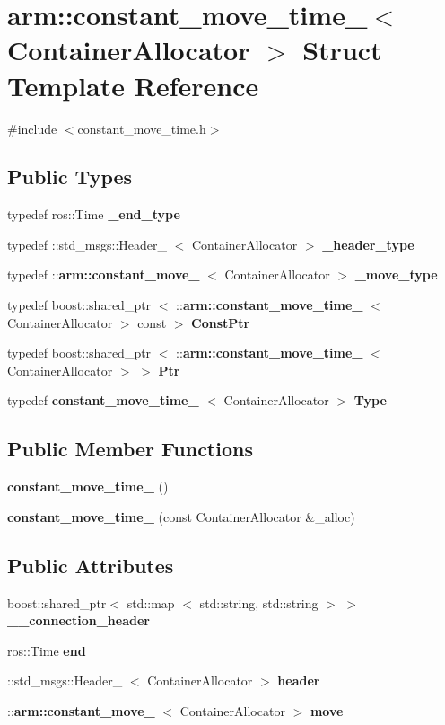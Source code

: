 \section{arm\-:\-:constant\-\_\-move\-\_\-time\-\_\-$<$ \-Container\-Allocator $>$ \-Struct \-Template \-Reference}
\label{structarm_1_1constant__move__time__}


{\ttfamily \#include $<$constant\-\_\-move\-\_\-time.\-h$>$}

\subsection*{\-Public \-Types}
\begin{DoxyCompactItemize}
\item 
typedef ros\-::\-Time {\bf \-\_\-end\-\_\-type}
\item 
typedef \-::std\-\_\-msgs\-::\-Header\-\_\-\*
$<$ \-Container\-Allocator $>$ {\bf \-\_\-header\-\_\-type}
\item 
typedef \-::{\bf arm\-::constant\-\_\-move\-\_\-}\*
$<$ \-Container\-Allocator $>$ {\bf \-\_\-move\-\_\-type}
\item 
typedef boost\-::shared\-\_\-ptr\*
$<$ \-::{\bf arm\-::constant\-\_\-move\-\_\-time\-\_\-}\*
$<$ \-Container\-Allocator $>$ const  $>$ {\bf \-Const\-Ptr}
\item 
typedef boost\-::shared\-\_\-ptr\*
$<$ \-::{\bf arm\-::constant\-\_\-move\-\_\-time\-\_\-}\*
$<$ \-Container\-Allocator $>$ $>$ {\bf \-Ptr}
\item 
typedef {\bf constant\-\_\-move\-\_\-time\-\_\-}\*
$<$ \-Container\-Allocator $>$ {\bf \-Type}
\end{DoxyCompactItemize}
\subsection*{\-Public \-Member \-Functions}
\begin{DoxyCompactItemize}
\item 
{\bf constant\-\_\-move\-\_\-time\-\_\-} ()
\item 
{\bf constant\-\_\-move\-\_\-time\-\_\-} (const \-Container\-Allocator \&\-\_\-alloc)
\end{DoxyCompactItemize}
\subsection*{\-Public \-Attributes}
\begin{DoxyCompactItemize}
\item 
boost\-::shared\-\_\-ptr$<$ std\-::map\*
$<$ std\-::string, std\-::string $>$ $>$ {\bf \-\_\-\-\_\-connection\-\_\-header}
\item 
ros\-::\-Time {\bf end}
\item 
\-::std\-\_\-msgs\-::\-Header\-\_\-\*
$<$ \-Container\-Allocator $>$ {\bf header}
\item 
\-::{\bf arm\-::constant\-\_\-move\-\_\-}\*
$<$ \-Container\-Allocator $>$ {\bf move}
\end{DoxyCompactItemize}


